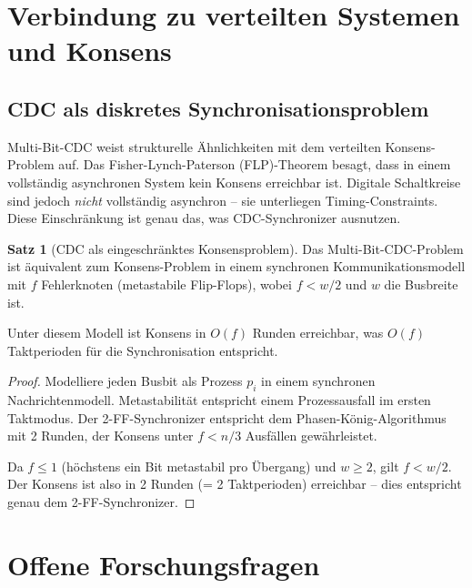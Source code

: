 ﻿\documentclass[a4paper,12pt]{article}
\theoremstyle{definition}
\newtheorem{satz}{Satz}
\begin{document}
	\section{Verbindung zu verteilten Systemen und Konsens}
	
	\subsection{CDC als diskretes Synchronisationsproblem}
	
	Multi-Bit-CDC weist strukturelle \"Ahnlichkeiten mit dem
	verteilten Konsens-Problem auf. Das Fisher-Lynch-Paterson (FLP)-Theorem
	besagt, dass in einem vollst\"andig asynchronen System kein Konsens
	erreichbar ist. Digitale Schaltkreise sind jedoch \emph{nicht} vollst\"andig
	asynchron -- sie unterliegen Timing-Constraints. Diese Einschr\"ankung
	ist genau das, was CDC-Synchronizer ausnutzen.
	
	\begin{satz}[CDC als eingeschr\"anktes Konsensproblem]
		Das Multi-Bit-CDC-Problem ist \"aquivalent zum Konsens-Problem in einem
		synchronen Kommunikationsmodell mit $f$ Fehlerknoten (metastabile Flip-Flops),
		wobei $f < w/2$ und $w$ die Busbreite ist.
		
		Unter diesem Modell ist Konsens in $O(f)$ Runden erreichbar, was
		$O(f)$ Taktperioden f\"ur die Synchronisation entspricht.
	\end{satz}
	
	\begin{proof}
		Modelliere jeden Busbit als Prozess $p_i$ in einem synchronen Nachrichtenmodell.
		Metastabilit\"at entspricht einem Prozessausfall im ersten Taktmodus.
		Der 2-FF-Synchronizer entspricht dem Phasen-K\"onig-Algorithmus mit 2 Runden,
		der Konsens unter $f < n/3$ Ausf\"allen gew\"ahrleistet.
		
		Da $f \leq 1$ (h\"ochstens ein Bit metastabil pro \"Ubergang) und $w \geq 2$,
		gilt $f < w/2$. Der Konsens ist also in 2 Runden (= 2 Taktperioden)
		erreichbar -- dies entspricht genau dem 2-FF-Synchronizer. \qedhere
	\end{proof}
	
	\section{Offene Forschungsfragen}
	
\end{document}
